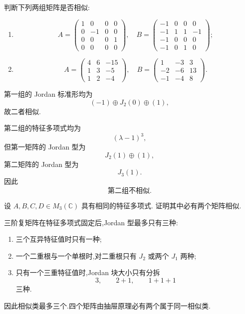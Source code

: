 \begin{example}
判断下列两组矩阵是否相似:
\begin{enumerate}
    \item
    \[
    A=
    \begin{pmatrix}
    1&0&0&0\\
    0&-1&0&0\\
    0&0&0&1\\
    0&0&0&0
    \end{pmatrix},
    \quad
    B=
    \begin{pmatrix}
    -1&0&0&0\\
    -1&1&1&-1\\
    -1&0&0&0\\
    -1&0&1&0
    \end{pmatrix};
    \]
    \item
    \[
    A=
    \begin{pmatrix}
    4&6&-15\\
    1&3&-5\\
    1&2&-4
    \end{pmatrix},
    \quad
    B=
    \begin{pmatrix}
    1&-3&3\\
    -2&-6&13\\
    -1&-4&8
    \end{pmatrix}.
    \]
\end{enumerate}
\end{example}
\exampleblank

\begin{solution}
第一组的 Jordan 标准形均为
\[
\boxed{
(-1)\oplus J_2(0)\oplus(1),
}
\]
故二者相似.

第二组的特征多项式均为
\[
(\lambda-1)^3,
\]
但第一矩阵的 Jordan 型为
\[
J_2(1)\oplus(1),
\]
第二矩阵的 Jordan 型为
\[
J_3(1).
\]
因此
\[
\boxed{\text{第二组不相似}.}
\]
\end{solution}


\begin{example}
设 $A,B,C,D\in M_3(\mathbb{C})$ 具有相同的特征多项式.
证明其中必有两个矩阵相似.
\end{example}
\exampleblank

\begin{solution}
三阶复矩阵在特征多项式固定后,Jordan 型最多只有三种:
\begin{enumerate}
    \item 三个互异特征值时只有一种;
    \item 一个二重根与一个单根时,对二重根只有
    $J_2$ 或两个 $J_1$ 两种;
    \item 只有一个三重特征值时,Jordan 块大小只有分拆
    \[
    3,\qquad2+1,\qquad1+1+1
    \]
    三种.
\end{enumerate}
因此相似类最多三个.四个矩阵由抽屉原理必有两个属于同一相似类.
\end{solution}


